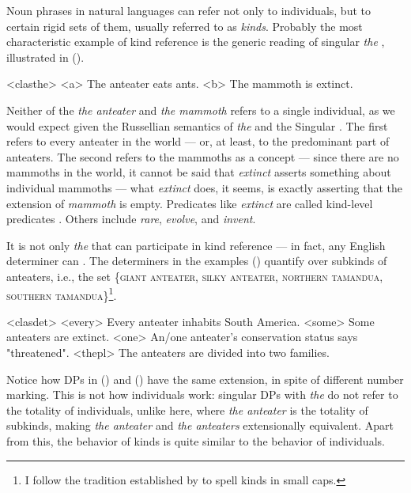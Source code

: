 \documentclass[a4paper, 12pt]{article}
\begin{document}
Noun phrases in natural languages can refer not only to individuals, but to certain rigid sets of them, usually referred to as \emph{kinds}. Probably the most characteristic example of kind reference is the generic reading of singular \textit{the} \parencite{carlson1977referencekindsenglish}, illustrated in (\nextx).

\pex<clasthe>
\a<a> The anteater eats ants.
\a<b> The mammoth is extinct.
\xe

Neither of the \textit{the anteater} and \textit{the mammoth} refers to a single individual, as we would expect given the Russellian semantics of \textit{the} \parencite{russell1905denoting} and the Singular \parencite{link1983logicalanalysisplurals}. The first refers to every anteater in the world --- or, at least, to the predominant part of anteaters. The second refers to the mammoths as a concept --- since there are no mammoths in the world, it cannot be said that \textit{extinct} asserts something about individual mammoths --- what \textit{extinct} does, it seems, is exactly asserting that the extension of \textit{mammoth} is empty. Predicates like \textit{extinct} are called kind-level predicates \parencite{krifka1995genericityintroduction}. Others include \textit{rare}, \textit{evolve}, and \textit{invent}.

It is not only \textit{the} that can participate in kind reference --- in fact, any English determiner can \parencite{dayal2004numbermarkingdefiniteness}. The determiners in the examples (\nextx) quantify over subkinds of anteaters, i.e., the set \{\textsc{giant anteater, silky anteater, northern tamandua, southern tamandua}\}\footnote{I follow the tradition established by \textcite{chierchia1998referencekindslanguages} to spell kinds in small caps.}. 

\pex<clasdet>
\a<every> Every anteater inhabits South America.
\a<some> Some anteaters are extinct.
\a<one> An/one anteater's conservation status says "threatened".
\a<thepl> The anteaters are divided into two families.
\xe

Notice how DPs in () and () have the same extension, in spite of different number marking. This is not how individuals work: singular DPs with \textit{the} do not refer to the totality of individuals, unlike here, where \textit{the anteater} is the totality of subkinds, making \textit{the anteater} and \textit{the anteaters} extensionally equivalent. Apart from this, the behavior of kinds is quite similar to the behavior of individuals.\footnotemark{}
\end{document}
